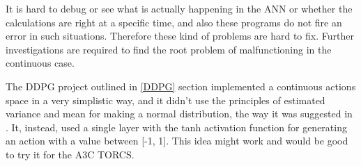 It is hard to debug or see what is actually happening in the ANN or whether the calculations are right at a specific time, and also these programs do not fire an error in such situations. Therefore these kind of problems are hard to fix. Further investigations are required to find the root problem of malfunctioning in the continuous case.

The DDPG project outlined in \ref{DDPG} section implemented a continuous actions space in a very simplistic way, and it didn't use the principles of estimated variance and mean for making a normal distribution, the way it was suggested in \cite{Sutton}. It, instead, used a single layer with the tanh activation function for generating an action with a value between [-1, 1]. This idea might work and would be good to try it for the A3C TORCS.